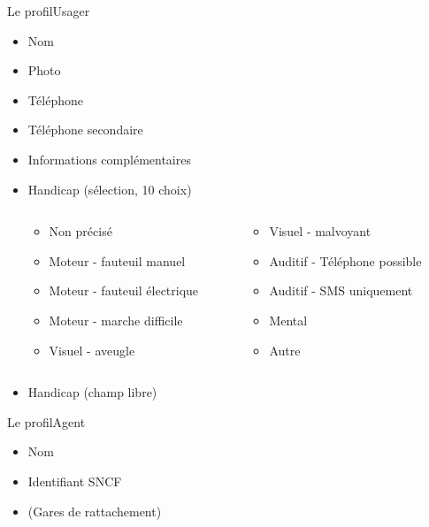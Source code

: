 \documentclass{beamer}
\begin{document}
\begin{frame}{Le profil}{Usager}
    \begin{itemize}
        \item Nom
        \item Photo
        \item Téléphone
        \item Téléphone secondaire
        \item Informations complémentaires
        \item Handicap (sélection, 10 choix)
            \begin{small}
                \begin{block}{}
                    \begin{columns}
                        \begin{column}{0.5\textwidth}
                            \begin{itemize}
                                \item Non précisé
                                \item Moteur - fauteuil manuel
                                \item Moteur - fauteuil électrique
                                \item Moteur - marche difficile
                            \item Visuel - aveugle
                        \end{itemize}
                    \end{column}
                    \begin{column}{0.5\textwidth}
                        \begin{itemize}
                            \item Visuel - malvoyant
                            \item Auditif - Téléphone possible
                            \item Auditif - SMS uniquement
                            \item Mental
                            \item Autre
                        \end{itemize}
                    \end{column}
                \end{columns}
            \end{block}
        \end{small}
        \item Handicap (champ libre)
    \end{itemize}
\end{frame}
\begin{frame}{Le profil}{Agent}
    \begin{itemize}
        \item Nom
        \item Identifiant SNCF
        \item (Gares de rattachement)
    \end{itemize}
\end{frame}
\end{document}
